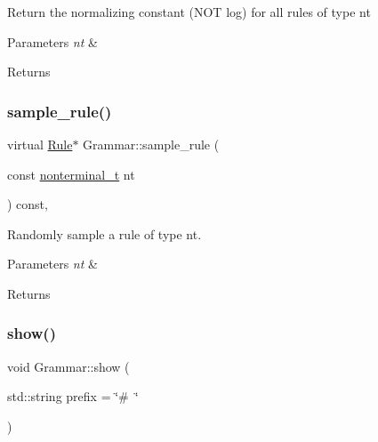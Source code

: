 Return the normalizing constant (N\+OT log) for all rules of type nt 
\begin{DoxyParams}{Parameters}
{\em nt} & \\
\hline
\end{DoxyParams}
\begin{DoxyReturn}{Returns}

\end{DoxyReturn}
\mbox{\label{class_grammar_a50c30e020e54743d5ede0ca9469fdb91}} 
\subsubsection{\texorpdfstring{sample\+\_\+rule()}{sample\_rule()}}
{\footnotesize\ttfamily virtual \hyperlink{class_rule}{Rule}$\ast$ Grammar\+::sample\+\_\+rule (\begin{DoxyParamCaption}\item[{const \hyperlink{_nonterminal_8h_a5c1f658dc7560600a16d22408bd716ca}{nonterminal\+\_\+t}}]{nt }\end{DoxyParamCaption}) const\hspace{0.3cm}{\ttfamily [inline]}, {\ttfamily [virtual]}}

Randomly sample a rule of type nt. 
\begin{DoxyParams}{Parameters}
{\em nt} & \\
\hline
\end{DoxyParams}
\begin{DoxyReturn}{Returns}

\end{DoxyReturn}
\mbox{\label{class_grammar_aa3c730ea64c8ca5d93fecb4275f2e380}} 
\subsubsection{\texorpdfstring{show()}{show()}}
{\footnotesize\ttfamily void Grammar\+::show (\begin{DoxyParamCaption}\item[{std\+::string}]{prefix = {\ttfamily \char`\"{}\#~\char`\"{}} }\end{DoxyParamCaption})\hspace{0.3cm}{\ttfamily [inline]}}

